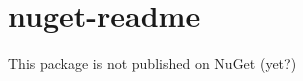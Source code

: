 \chapter{nuget-\/readme}
\hypertarget{md__scott_plot_2src_2_scott_plot5_2_scott_plot5_01_controls_2_scott_plot_8_open_g_l_2nuget-readme}{}\label{md__scott_plot_2src_2_scott_plot5_2_scott_plot5_01_controls_2_scott_plot_8_open_g_l_2nuget-readme}
This package is not published on Nu\+Get (yet?) 